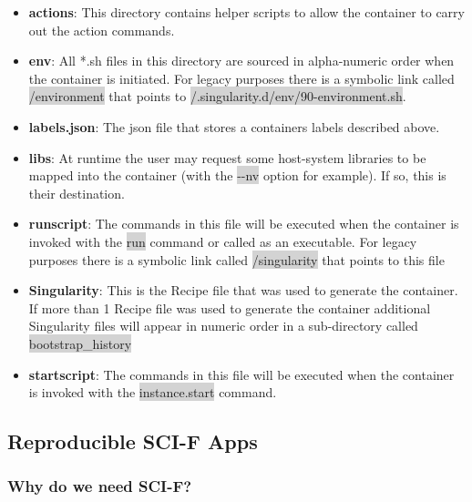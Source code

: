 \documentclass[a4paper]{article}
\begin{document}
\begin{itemize}
\item \textbf{actions}: This directory contains helper scripts to allow the container to carry out the action commands.
\item \textbf{env}: All *.sh files in this directory are sourced in alpha-numeric order when the container is initiated. For legacy purposes there is a symbolic link called \colorbox{lightgray}{/environment} that points to \colorbox{lightgray}{/.singularity.d/env/90-environment.sh}.
\item \textbf{labels.json}: The json file that stores a containers labels described above.
\item \textbf{libs}: At runtime the user may request some host-system libraries to be mapped into the container (with the \colorbox{lightgray}{-{}-nv} option for example). If so, this is their destination.
\item \textbf{runscript}: The commands in this file will be executed when the container is invoked with the \colorbox{lightgray}{run} command or called as an executable. For legacy purposes there is a symbolic link called \colorbox{lightgray}{/singularity} that points to this file
\item \textbf{Singularity}: This is the Recipe file that was used to generate the container. If more than 1 Recipe file was used to generate the container additional Singularity files will appear in numeric order in a sub-directory called \colorbox{lightgray}{bootstrap\_history}
\item \textbf{startscript}: The commands in this file will be executed when the container is invoked with the \colorbox{lightgray}{instance.start} command.
\end{itemize}

\subsection{Reproducible SCI-F Apps}
\label{sec:scifapps}
\subsubsection{Why do we need SCI-F?}
\end{document}
